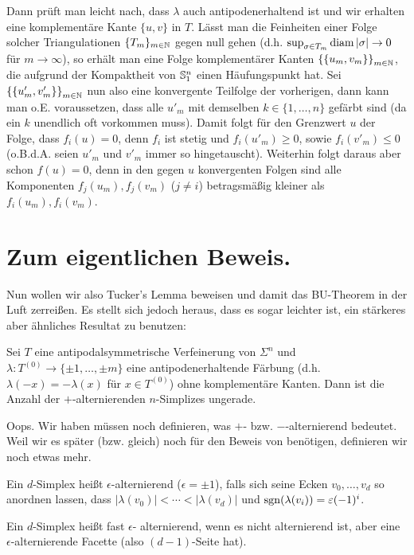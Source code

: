 \documentclass[10pt,a4paper]{article}
\begin{document}
Dann prüft man leicht nach, dass $\lambda$ auch antipodenerhaltend ist und wir erhalten eine komplementäre Kante $\{u,v\}$ in $T$. Lässt man die Feinheiten einer Folge solcher Triangulationen $\{T_m\}_{m\in\mathbb{N}}$ gegen null gehen (d.h. $\sup_{\sigma\in T_m}{\mathop\mathrm{diam}{\left|\sigma\right|}}\rightarrow 0$ für $m\to \infty$), so erhält man eine Folge komplementärer Kanten ${\{\{u_m,v_m\}\}}_{m\in\mathbb{N}}$, die aufgrund der Kompaktheit von $\mathbb{S}^n_1$ einen Häufungspunkt hat. Sei ${\{\{u'_m,v'_m\}\}}_{m\in\mathbb{N}}$ nun also eine konvergente Teilfolge der vorherigen, dann kann man o.E. voraussetzen, dass alle $u'_m$ mit demselben $k\in\{1,\ldots,n\}$ gefärbt sind (da ein $k$ unendlich oft vorkommen muss). Damit folgt für den Grenzwert $u$ der Folge, dass $f_i(u) = 0$, denn $f_i$ ist stetig und $f_i(u'_m)\geq 0$, sowie $f_i(v'_m)\leq 0$ (o.B.d.A. seien $u'_m$ und $v'_m$ immer so hingetauscht). Weiterhin folgt daraus aber schon $f(u)=0$, denn in den gegen $u$ konvergenten Folgen sind alle Komponenten $f_j(u_m),f_j(v_m)$ ($j\neq i$) betragsmäßig kleiner als $f_i(u_m),f_i(v_m)$.

\section{Zum eigentlichen Beweis.}

Nun wollen wir also Tucker's Lemma beweisen und damit das BU-Theorem in der Luft zerreißen.
Es stellt sich jedoch heraus, dass es sogar leichter ist, ein stärkeres aber ähnliches Resultat zu benutzen:

\begin{lemma}[Ky Fan]\label{lem:kyfan}
Sei $T$ eine antipodalsymmetrische Verfeinerung von $\Sigma^n$ und $\lambda:T^{(0)}\to\{\pm1,\ldots,\pm m\}$ eine antipodenerhaltende Färbung (d.h. $\lambda(-x)=-\lambda(x)$ für $x\in T^{(0)}$) ohne komplementäre Kanten. Dann ist die Anzahl der $+$-alternierenden $n$-Simplizes ungerade. 
\end{lemma}

Oops. Wir haben müssen noch definieren, was $+$- bzw. $-$-alternierend bedeutet.
Weil wir es später (bzw. gleich) noch für den Beweis von  benötigen, definieren wir noch etwas mehr.

\begin{definition}
Ein $d$-Simplex heißt $\epsilon$-alternierend ($\epsilon=\pm1$), falls sich seine Ecken $v_0,\ldots,v_d$ so anordnen lassen, dass $|\lambda(v_0)|<\cdots<|\lambda(v_d)|$ und $\mathop\mathrm{sgn}(\lambda(v_i))=\varepsilon(-1)^i$. 

Ein $d$-Simplex heißt fast $\epsilon$- alternierend, wenn es nicht alternierend ist, aber eine $\epsilon$-alternierende Facette (also $(d-1)$-Seite hat).
\end{definition}
\end{document}

